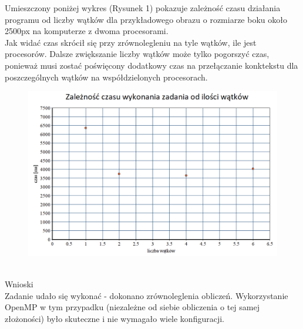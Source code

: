 \documentclass[a4paper,12pt]{article}
\begin{document}
Umieszczony poniżej wykres (Rysunek 1) pokazuje zależność czasu działania programu od liczby wątków dla przykładowego obrazu o rozmiarze boku około 2500px na komputerze z dwoma procesorami. \\
Jak widać czas skrócił się przy zrównolegleniu na tyle wątków, ile jest procesorów. Dalsze zwiększanie liczby wątków może tylko pogorszyć czas, ponieważ musi zostać poświęcony dodatkowy czas na przełączanie konktekstu dla poszczególnych wątków na współdzielonych procesorach.
\begin{figure}[h]
\includegraphics[width=15cm]{wykres_zad1}
\caption{}  
\end{figure}
\\

Wnioski \\
Zadanie udało się wykonać - dokonano zrównoleglenia obliczeń. Wykorzystanie OpenMP w tym przypadku (niezależne od siebie obliczenia o tej samej złożoności) było skuteczne i nie wymagało wiele konfiguracji. 
\end{document}
